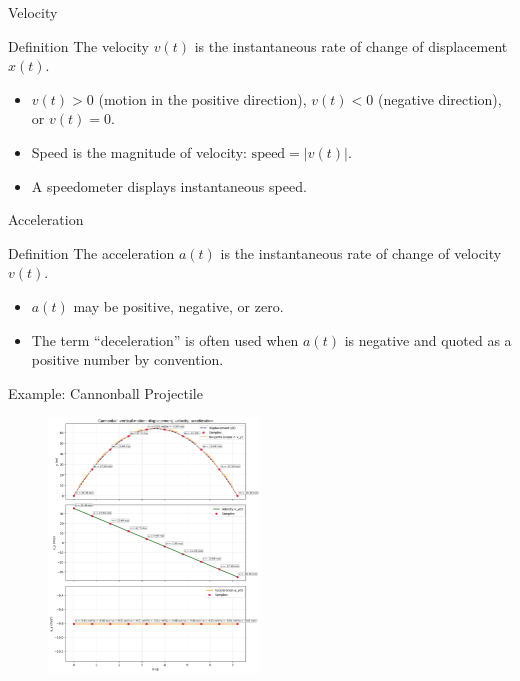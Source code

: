\documentclass{beamer}
\begin{document}
\begin{frame}{Velocity}
  \begin{block}{Definition}
    The velocity $v(t)$ is the instantaneous rate of change of displacement $x(t)$.
  \end{block}
  \begin{itemize}
    \item $v(t)>0$ (motion in the positive direction), $v(t)<0$ (negative direction), or $v(t)=0$.
    \item Speed is the magnitude of velocity: $\text{speed}=\lvert v(t)\rvert$.
    \item A speedometer displays instantaneous speed.
  \end{itemize}
\end{frame}

\begin{frame}{Acceleration}
  \begin{block}{Definition}
    The acceleration $a(t)$ is the instantaneous rate of change of velocity $v(t)$.
  \end{block}
  \begin{itemize}
    \item $a(t)$ may be positive, negative, or zero.
    \item The term “deceleration” is often used when $a(t)$ is negative and quoted as a positive number by convention.
  \end{itemize}
\end{frame}

\begin{frame}{Example: Cannonball Projectile}
  \begin{figure}
    \centering
    \includegraphics[width=0.5\textwidth]{figures/cannonball.png}
  \end{figure}
\end{frame}
\end{document}
